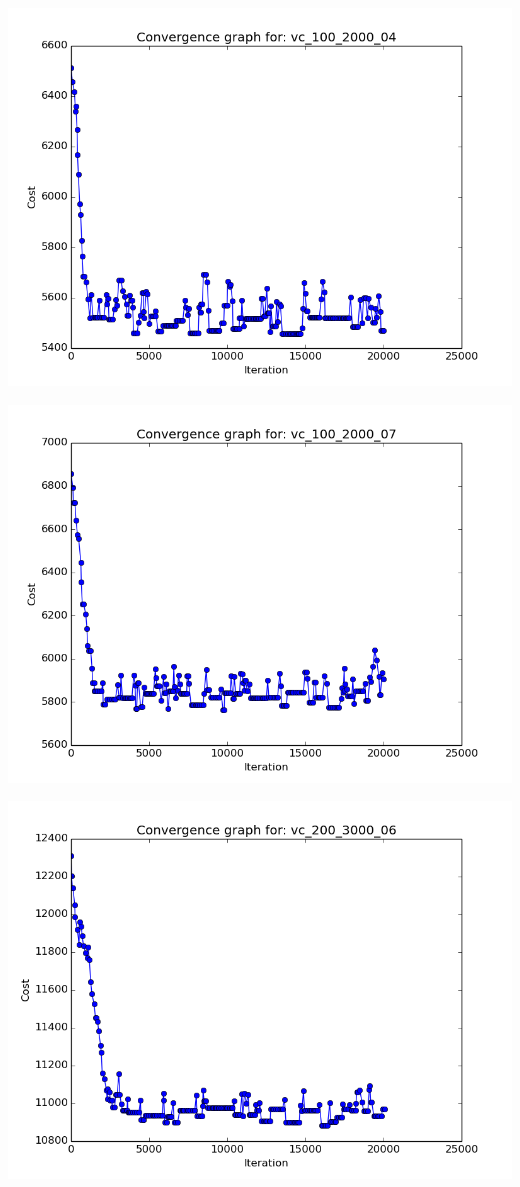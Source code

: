 \documentclass[11pt]{article}
\begin{document}
\begin{center}
\begin{minipage}{0.49\linewidth}
\end{minipage}
\begin{minipage}{0.49\linewidth}
\includegraphics[width=\linewidth]{cg_3.png}
\end{minipage}
\begin{minipage}{0.49\linewidth}
\includegraphics[width=\linewidth]{cg_4.png}
\end{minipage}
\begin{minipage}{0.49\linewidth}
\includegraphics[width=\linewidth]{cg_5.png}

\end{minipage}
\end{center}
\end{document}
